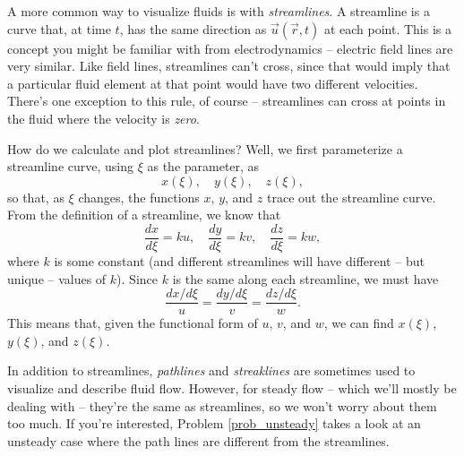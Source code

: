A more common way to visualize fluids is with \emph{streamlines}.  A streamline is a curve that, at time \(t\), has the same direction as \(\vec{u}(\vec{r}, t)\) at each point. This is a concept you might be familiar with from electrodynamics -- electric field lines are very similar.  Like field lines, streamlines can't cross, since that would imply that a particular fluid element at that point would have two different velocities.  There's one exception to this rule, of course -- streamlines can cross at points in the fluid where the velocity is \emph{zero}.

How do we calculate and plot streamlines? Well, we first parameterize a streamline curve, using $\xi$ as the parameter, as 
\[
x(\xi), \quad y(\xi), \quad z(\xi),
\] 
so that, as $\xi$ changes, the functions $x$, $y$, and $z$ trace out the streamline curve.   From the definition of a streamline, we know that
\[
\frac{dx}{d\xi} = ku, \quad \frac{dy}{d\xi} = kv, \quad \frac{dz}{d\xi} = kw,
\] 
where $k$ is some constant (and different streamlines will have different -- but unique -- values of $k$). Since $k$ is the same along each streamline, we must have
\begin{equation}
\frac{dx/d\xi}{u} = \frac{dy/d\xi}{v} = \frac{dz/d\xi}{w}.
\end{equation} 
This means that, given the functional form of $u$, $v$, and $w$, we can find $x(\xi)$, $y(\xi)$, and $z(\xi)$.

In addition to streamlines, \emph{pathlines} and \emph{streaklines} are sometimes used to visualize and describe fluid flow.  However, for steady flow -- which we'll mostly be dealing with -- they're the same as streamlines, so we won't worry about them too much.  If you're interested, Problem \ref{prob_unsteady} takes a look at an unsteady case where the path lines are different from the streamlines.



